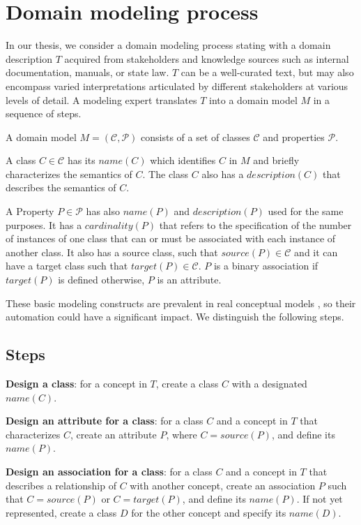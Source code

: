 \chapter{Domain modeling process}

In our thesis, we consider a domain modeling process stating with a domain description $T$ acquired from stakeholders and knowledge sources such as internal documentation, manuals, or state law. $T$ can be a well-curated text, but may also encompass varied interpretations articulated by different stakeholders at various levels of detail. A modeling expert translates $T$ into a domain model $M$ in a sequence of steps.

A domain model $M = (\mathcal{C}, \mathcal{P})$ consists of a set of classes $\mathcal{C}$ and properties $\mathcal{P}$.

A class $C \in \mathcal{C}$ has its $name(C)$ which identifies $C$ in $M$ and briefly characterizes the semantics of $C$. The class $C$ also has a $description(C)$ that describes the semantics of $C$.

A Property $P \in \mathcal{P}$ has also $name(P)$ and $description(P)$ used for the same purposes. It has a $cardinality(P)$ that refers to the specification of the number of instances of one class that can or must be associated with each instance of another class. It also has a source class, such that $source(P) \in \mathcal{C}$ and it can have a target class such that $target(P) \in \mathcal{C}$. $P$ is a binary association if $target(P)$ is defined otherwise, $P$ is an attribute.

These basic modeling constructs are prevalent in real conceptual models \cite{Keet2015}, so their automation could have a significant impact. We distinguish the following steps.


\section{Steps}

\textbf{Design a class}:
for a concept in $T$, create a class $C$ with a designated $name(C)$.

\textbf{Design an attribute for a class}:
for a class $C$ and a concept in $T$ that characterizes $C$, create an attribute $P$, where $C = source(P)$, and define its $name(P)$.

\textbf{Design an association for a class}:
for a class $C$ and a concept in $T$ that describes a relationship of $C$ with another concept, create an association $P$ such that $C = source(P)$ or $C = target(P)$, and define its $name(P)$. If not yet represented, create a class $D$ for the other concept and specify its $name(D)$.

